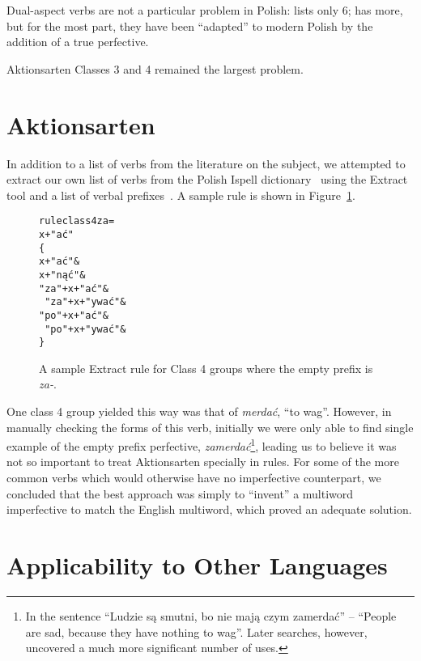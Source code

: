 \documentclass[11pt]{article}
\begin{document}
Dual-aspect verbs are not a particular problem in Polish: \cite{jagod} 
lists only 6; \cite{futrega} has more, but for the most part, they
have been ``adapted'' to modern Polish by the addition of a true
perfective.

Aktionsarten Classes 3 and 4 remained the largest problem.

\section{Aktionsarten}

In addition to a list of verbs from the literature on the 
subject\cite{aalstein07}, we attempted to extract our own list of verbs
from the Polish Ispell dictionary~\cite{futrega} using the Extract
tool\cite{forsberg07} and a list of verbal prefixes~\cite[5.15.2]{bielec}.
A sample rule is shown in Figure~\ref{figure:extract}.

\begin{figure}[htbp]
\label{figure:extract}
\begin{small}
\begin{alltt}
rule class4za = 
x+"ać"
\{ 
  x+"ać" \&
  x+"nąć" \&
  "za"+x+"ać" \&
  ~"za"+x+"ywać" \&
  "po"+x+"ać" \&
  ~"po"+x+"ywać" \&
\}
\end{alltt}
\end{small}
\caption{A sample Extract rule for Class 4 groups where the
empty prefix is {\it za-}.}
\end{figure}

One class 4 group yielded this way was that of {\it merda\'{c}},
``to wag''. However, in manually checking the forms of this verb,
initially we were only able to find single example of the empty prefix 
perfective, {\it zamerda\'{c}}\footnote{In the sentence ``Ludzie s\k{a}
smutni, bo nie maj\k{a} czym zamerda\'{c}'' -- ``People are sad, because
they have nothing to wag''. Later searches, however, uncovered a much 
more significant number of uses.}, leading us to believe it was not so
important to treat Aktionsarten specially in rules. For some of
the more common verbs which would otherwise have no imperfective
counterpart, we concluded that the best approach was simply to ``invent'' 
a multiword imperfective to match the English multiword, which
proved an adequate solution.

\section{Applicability to Other Languages}
\end{document}

